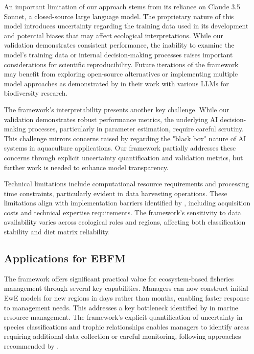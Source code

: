 An important limitation of our approach stems from its reliance on Claude 3.5 Sonnet, a closed-source large language model. The proprietary nature of this model introduces uncertainty regarding the training data used in its development and potential biases that may affect ecological interpretations. While our validation demonstrates consistent performance, the inability to examine the model's training data or internal decision-making processes raises important considerations for scientific reproducibility. Future iterations of the framework may benefit from exploring open-source alternatives or implementing multiple model approaches as demonstrated by \cite{Kommineni2024} in their work with various LLMs for biodiversity research.

The framework's interpretability presents another key challenge. While our validation demonstrates robust performance metrics, the underlying AI decision-making processes, particularly in parameter estimation, require careful scrutiny. This challenge mirrors concerns raised by \cite{Fernandes2024} regarding the "black box" nature of AI systems in aquaculture applications. Our framework partially addresses these concerns through explicit uncertainty quantification and validation metrics, but further work is needed to enhance model transparency.

Technical limitations include computational resource requirements and processing time constraints, particularly evident in data harvesting operations. These limitations align with implementation barriers identified by \cite{Fernandes2024}, including acquisition costs and technical expertise requirements. The framework's sensitivity to data availability varies across ecological roles and regions, affecting both classification stability and diet matrix reliability.

\subsection{Applications for EBFM}

The framework offers significant practical value for ecosystem-based fisheries management through several key capabilities. Managers can now construct initial EwE models for new regions in days rather than months, enabling faster response to management needs. This addresses a key bottleneck identified by \cite{Zheng2023} in marine resource management. The framework's explicit quantification of uncertainty in species classifications and trophic relationships enables managers to identify areas requiring additional data collection or careful monitoring, following approaches recommended by \cite{Kuhn2024}. 


